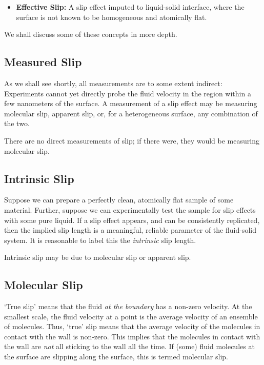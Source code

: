 \documentclass[12pt, a4paper, twoside, openright]{book}
\begin{document}
\begin{itemize}
\item \textbf{Effective Slip:} A slip effect imputed to liquid-solid interface, where the surface is not known to be homogeneous and atomically flat.
\end{itemize} 

We shall discuss some of these concepts in more depth.

\subsection{Measured Slip}
As we shall see shortly, all measurements are to some extent indirect: Experiments cannot yet directly probe the fluid velocity in the region within a few nanometers of the surface. A measurement of a slip effect may be measuring molecular slip, apparent slip, or, for a heterogeneous surface, any combination of the two.

There are no direct measurements of slip; if there were, they would be measuring molecular slip.


\subsection{Intrinsic Slip}
Suppose we can prepare a perfectly clean, atomically flat sample of some material. Further, suppose we can experimentally test the sample for slip effects with some pure liquid.
If a slip effect appears, and can be consistently replicated, then the implied slip length is a meaningful, reliable parameter of the fluid-solid system. It is reasonable to label this the \emph{intrinsic} slip length.

Intrinsic slip may be due to molecular slip or apparent slip.


\subsection{Molecular Slip}
`True slip' means that the fluid \emph{at the boundary} has a non-zero velocity.
At the smallest scale, the fluid velocity at a point is the average velocity of an ensemble of molecules.  Thus, `true' slip means that the average velocity of the molecules in contact with the wall is non-zero.
This implies that the molecules in contact with the wall are \emph{not} all sticking to the wall all the time.
If (some) fluid molecules at the surface are slipping along the surface, this is termed molecular slip.
\end{document}
